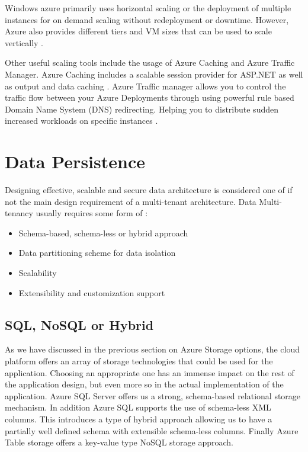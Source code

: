 Windows azure primarily uses horizontal scaling or the deployment of multiple instances for on demand scaling without redeployment or downtime. However, Azure also provides different tiers and VM sizes that can be used to scale vertically \cite{Betts2012-ad}.
 
Other useful scaling tools include the usage of Azure Caching and Azure Traffic Manager. Azure Caching includes a scalable session provider for ASP.NET as well as output and data caching \cite{Microsoft_Corporation_undated-ej}. Azure Traffic manager allows you to control the traffic flow between your Azure Deployments through using powerful rule based Domain Name System (DNS) redirecting. Helping you to distribute sudden increased workloads on specific instances \cite{Betts2012-ad}.

\section{Data Persistence}

Designing effective, scalable and secure data architecture is considered one of if not the main design requirement of a multi-tenant architecture.
Data Multi-tenancy usually requires some form of \cite{Betts2012-ad}:

\begin{itemize}
\item Schema-based, schema-less or hybrid approach
\item Data partitioning scheme for data isolation
\item Scalability
\item Extensibility and customization support
\end{itemize}


\subsection{SQL, NoSQL or Hybrid}

As we have discussed in the previous section on Azure Storage options, the cloud platform offers an array of storage technologies that could be used for the application. Choosing an appropriate one has an immense impact on the rest of the application design, but even more so in the actual implementation of the application. Azure SQL Server offers us a strong, schema-based relational storage mechanism. In addition Azure SQL supports the use of schema-less XML columns. This introduces a type of hybrid approach allowing us to have a partially well defined schema with extensible schema-less columns. Finally Azure Table storage offers a key-value type NoSQL storage approach.
 
